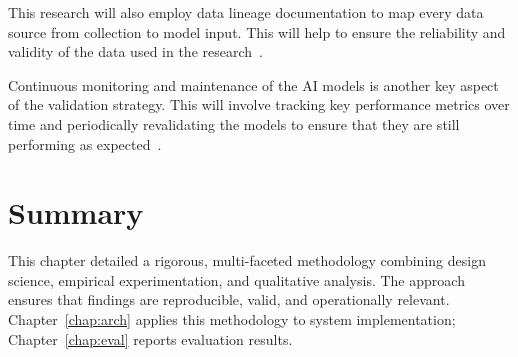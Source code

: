 This research will also employ data lineage documentation to map every data source from collection to model input. This will help to ensure the reliability and validity of the data used in the research~\cite{luthor2024lineage}.

Continuous monitoring and maintenance of the AI models is another key aspect of the validation strategy. This will involve tracking key performance metrics over time and periodically revalidating the models to ensure that they are still performing as expected~\cite{medium2024monitoring}.

\section{Summary}
This chapter detailed a rigorous, multi-faceted methodology combining design science, empirical experimentation, and qualitative analysis. The approach ensures that findings are reproducible, valid, and operationally relevant. Chapter~\ref{chap:arch} applies this methodology to system implementation; Chapter~\ref{chap:eval} reports evaluation results.
